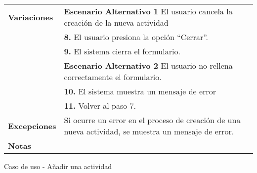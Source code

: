 \begin{analisisCasoDeUso}
\begin{tabular} { | m{3cm} | p{13cm} | }
		{\bfseries Variaciones}     & {\bfseries Escenario Alternativo 1} El usuario cancela la creación de la nueva actividad             \\
		                            & {\bfseries 8.} El usuario presiona la opción “Cerrar”.                                               \\
		                            & {\bfseries 9.} El sistema cierra el formulario.                                                      \\
		                            & {\bfseries Escenario Alternativo 2} El usuario no rellena correctamente el formulario.               \\
		                            & {\bfseries 10.} El sistema muestra un mensaje de error                                               \\
		                            & {\bfseries 11.} Volver al paso 7.                                                                    \\ \hline
		{\bfseries Excepciones}     & Si ocurre un error en el proceso de creación de una nueva actividad, se muestra un mensaje de error. \\ \hline
		{\bfseries Notas }          &                                                                                                      \\ \hline
	\end{tabular}
	\caption{Caso de uso - Añadir una actividad}
\end{analisisCasoDeUso}